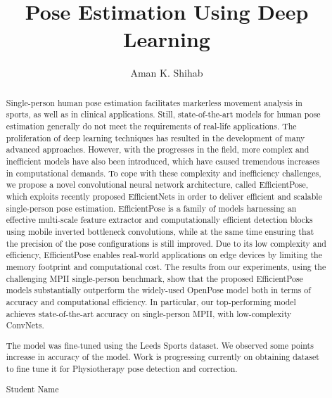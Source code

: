 \documentclass{fisatprojectfinal}
\title{Pose Estimation Using Deep Learning}
\author{Aman K. Shihab}
\begin{document}
\maketitle
\makecert

\newpage
{}
\setcounter{page}{1}
\thispagestyle{plain}
\renewcommand\abstractname{ABSTRACT}
\begin{abstract}
\vspace{5cm}
Single-person human pose estimation facilitates markerless movement analysis in sports, as well as in clinical applications.
Still, state-of-the-art models for human pose estimation generally do not meet the requirements of real-life applications.
The proliferation of deep learning techniques has resulted in the development of many advanced approaches. However,
with the progresses in the field, more complex and inefficient models have also been introduced, which have caused
tremendous increases in computational demands. To cope with these complexity and inefficiency challenges, we propose
a novel convolutional neural network architecture, called EfficientPose, which exploits recently proposed EfficientNets
in order to deliver efficient and scalable single-person pose estimation. EfficientPose is a family of models harnessing
an effective multi-scale feature extractor and computationally efficient detection blocks using mobile inverted bottleneck
convolutions, while at the same time ensuring that the precision of the pose configurations is still improved. Due to its low
complexity and efficiency, EfficientPose enables real-world applications on edge devices by limiting the memory footprint
and computational cost. The results from our experiments, using the challenging MPII single-person benchmark, show that
the proposed EfficientPose models substantially outperform the widely-used OpenPose model both in terms of accuracy and
computational efficiency. In particular, our top-performing model achieves state-of-the-art accuracy on single-person MPII,
with low-complexity ConvNets.
\end{abstract}



\newpage
\renewcommand\abstractname{Contribution by Author}
\thispagestyle{plain}
\begin{abstract}
\vspace{5cm}
The model was fine-tuned using the Leeds Sports dataset. We observed some points increase in accuracy of the model.
Work is progressing currently on obtaining dataset to fine tune it for Physiotherapy pose detection and correction.
\vspace{1cm}
\begin{flushright}
Student Name
\end{flushright}
\end{abstract}
\end{document}
